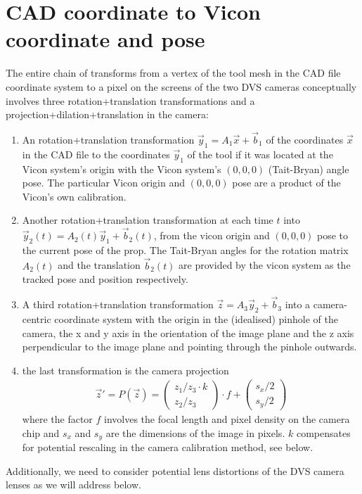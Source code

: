 \documentclass{article}
\begin{document}
\section{CAD coordinate to Vicon coordinate and pose}
The entire chain of transforms from a vertex of the tool mesh in the
CAD file coordinate system to a pixel on the screens of the two DVS
cameras conceptually involves three rotation+translation transformations and a
projection+dilation+translation in the camera:
\begin{enumerate}
\item An rotation+translation transformation $\vec{y}_1 = A_1 \vec{x} +\vec{b}_1$ of the
  coordinates $\vec{x}$ in the CAD file to the coordinates $\vec{y}_1$
  of the tool if it was located at the Vicon system's origin with the
  Vicon system's $(0,0,0)$ (Tait-Bryan) angle pose. The particular Vicon origin and
  $(0,0,0)$ pose are a product of the Vicon's own calibration.
\item Another rotation+translation transformation at each time $t$ into
  $\vec{y}_2(t) = A_2(t) \vec{y}_1 + \vec{b}_2(t)$, from the vicon origin
  and $(0,0,0)$ pose to the current pose of the prop. The Tait-Bryan
  angles for the rotation matrix $A_2(t)$ and the translation $\vec{b}_2(t)$
  are provided by the vicon system as the tracked pose and position respectively.
\item A third rotation+translation transformation $\vec{z}= A_3
  \vec{y}_2 +\vec{b}_3$ into a camera-centric coordinate system with
  the origin in the (idealised) pinhole of the camera, the x and y
  axis in the orientation of the image plane and the z axis
  perpendicular to the image plane and pointing
  through the pinhole outwards.
\item the last transformation is the camera projection
  \begin{align}
    \vec{z}' = P(\vec{z}) = 
    \left(\begin{array}{c} z_1/z_3 \cdot k \\ z_2/z_3 \end{array}\right) \cdot f
    + \left(\begin{array}{c} s_x / 2 \\ s_y / 2 \end{array}\right)
  \end{align}
  where the factor $f$ involves the focal length and pixel density on
  the camera chip and $s_x$ and $s_y$ are the dimensions of the image in pixels. $k$ compensates for potential rescaling in the camera calibration method, see below.
\end{enumerate}
Additionally, we need to consider potential lens distortions of the
DVS camera lenses as we will address below.
\end{document}
